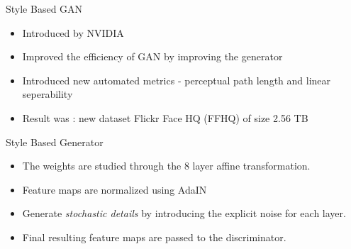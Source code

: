 
\begin{frame}[fragile]{Style Based GAN}
        \begin{itemize}
        \item Introduced by NVIDIA 
        \item Improved the efficiency of GAN by improving the generator
        \item Introduced new automated metrics - perceptual path length and linear seperability
        \item Result was  : new dataset Flickr Face HQ (FFHQ) of size 2.56 TB
    \end{itemize}

\end{frame}

\begin{frame}[fragile]{Style Based Generator}
        \begin{itemize}
        \item The weights are studied through the 8 layer affine transformation.
        \item Feature maps are normalized using AdaIN
        \item Generate \textit{stochastic details} by introducing the explicit noise for each layer.
        \item Final resulting feature maps are passed to the discriminator.
    \end{itemize}

\end{frame}

